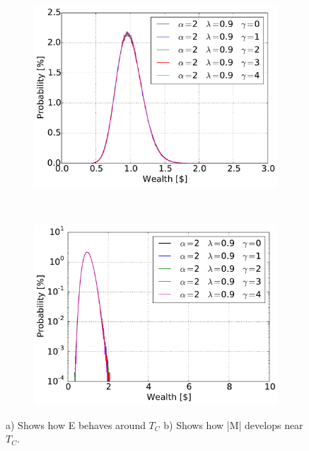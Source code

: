 \begin{figure}[H]
    \centering
    \begin{subfigure}{0.5\textwidth}
        \centering
        \includegraphics[width=\linewidth]{result/bilder/5e-2-90}
        \caption{}
    \end{subfigure}%
    ~ 
    \begin{subfigure}{0.5\textwidth}
        \centering
        \includegraphics[width=\linewidth]{result/bilder/5e-2-90-log}
        \caption{}
    \end{subfigure}
    \caption{a) Shows how E behaves around $T_C$ b) Shows how |M| develops near $T_C$.}
    \label{fig:5e-2-90}
\end{figure}













